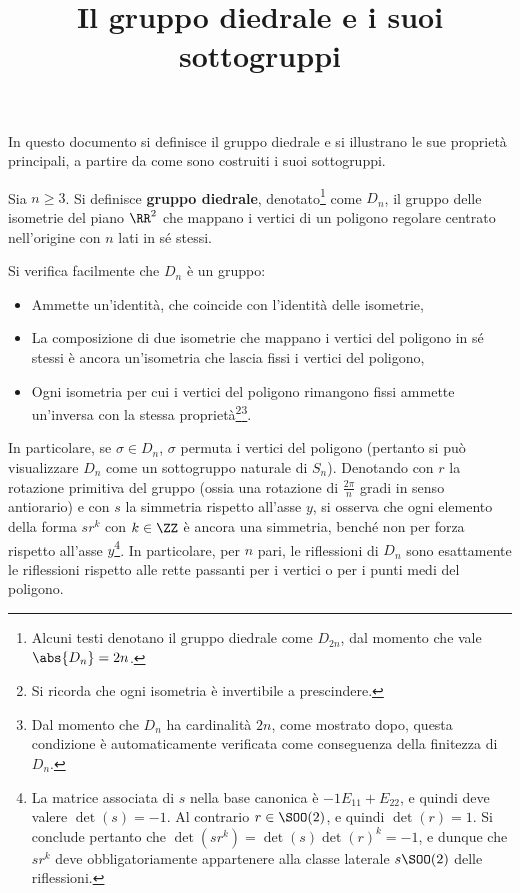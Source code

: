 \documentclass[12pt]{scrartcl}
\begin{document}
	\title{Il gruppo diedrale e i suoi sottogruppi}
	\maketitle

	In questo documento si definisce il gruppo diedrale e si illustrano
	le sue proprietà principali, a partire da come sono costruiti i suoi
	sottogruppi. \medskip
	
	
	Sia $n \geq 3$. Si definisce \textbf{gruppo diedrale}, denotato\footnote{
		Alcuni testi denotano il gruppo diedrale come $D_{2n}$, dal
		momento che vale $\abs{D_n} = 2n$.
	} come $D_n$, il gruppo delle isometrie del piano $\RR^2$ che mappano i vertici di
	un poligono regolare centrato nell'origine con $n$ lati in sé stessi. \medskip
	
	
	Si verifica facilmente che $D_n$ è un gruppo:
	\begin{itemize}
		\item Ammette un'identità, che coincide con l'identità delle isometrie,
		\item La composizione di due isometrie che mappano i vertici del poligono in
			sé stessi è ancora un'isometria che lascia fissi i vertici del poligono,
		\item Ogni isometria per cui i vertici del poligono rimangono fissi ammette
			un'inversa con la stessa proprietà\footnote{
				Si ricorda che ogni isometria è invertibile a prescindere.
			}\footnote{
				Dal momento che $D_n$ ha cardinalità $2n$, come mostrato dopo, questa
				condizione è automaticamente verificata come conseguenza della finitezza
				di $D_n$.
			}.
	\end{itemize}
	
	In particolare, se $\sigma \in D_n$, $\sigma$ permuta i vertici del poligono (pertanto
	si può visualizzare $D_n$ come un sottogruppo naturale di $S_n$). Denotando con
	$r$ la rotazione primitiva del gruppo (ossia una rotazione di $\frac{2\pi}{n}$ gradi in
	senso antiorario) e con $s$ la simmetria rispetto all'asse $y$, si osserva che
	ogni elemento della forma $s r^k$ con $k \in \ZZ$ è ancora una simmetria, benché non
	per forza rispetto all'asse $y$\footnote{
		La matrice associata di $s$ nella base canonica è $-1 E_{11} + E_{22}$, e quindi deve valere $\det(s) = -1$. Al contrario $r \in \SOO(2)$, e quindi $\det(r) = 1$. Si conclude pertanto che
		$\det(s r^k) = \det(s) \det(r)^k = -1$, e dunque che $s r^k$ deve obbligatoriamente
		appartenere alla classe laterale $s \SOO(2)$ delle riflessioni.
	}. In particolare, per $n$ pari, le riflessioni di $D_n$ sono esattamente le riflessioni
	rispetto alle rette passanti per i vertici o per i punti medi del poligono. \medskip
	
\end{document}
